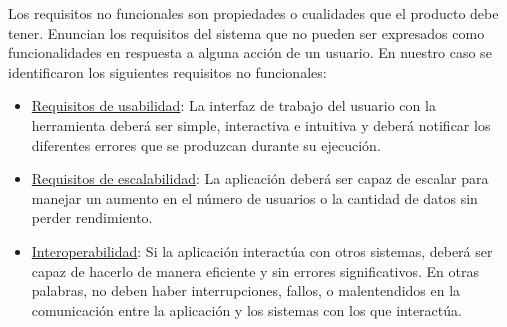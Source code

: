 Los requisitos no funcionales son propiedades o cualidades que el producto debe tener. Enuncian los requisitos del sistema que no pueden ser expresados como funcionalidades en respuesta a alguna acción de un usuario. En nuestro caso se identificaron los siguientes requisitos no funcionales:
        
\begin{itemize}
    \item \underline{Requisitos de usabilidad}: La interfaz de trabajo del usuario con la herramienta deberá ser simple, interactiva e intuitiva y deberá notificar los diferentes errores que se produzcan durante su ejecución.
    
    \item \underline{Requisitos de escalabilidad}: La aplicación deberá ser capaz de escalar para manejar un aumento en el número de usuarios o la cantidad de datos sin perder rendimiento.     
    
    \item \underline{Interoperabilidad}: Si la aplicación interactúa con otros sistemas, deberá ser capaz de hacerlo de manera eficiente y sin errores significativos. En otras palabras, no deben haber interrupciones, fallos, o malentendidos en la comunicación entre la aplicación y los sistemas con los que interactúa.
\end{itemize}

